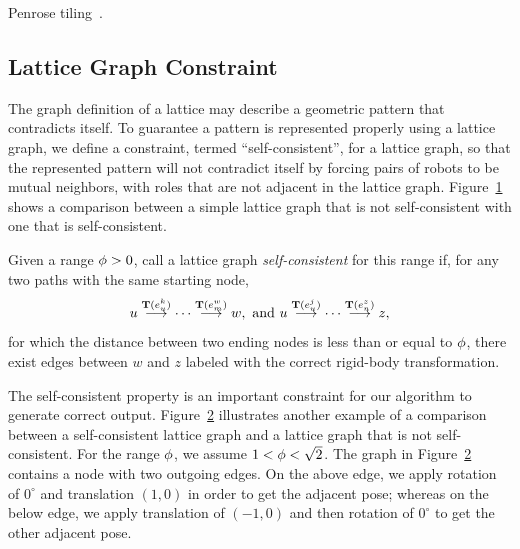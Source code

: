 Penrose tiling~\cite{Pen79, Gum96}.

\subsection{Lattice Graph Constraint}
The graph definition of a lattice may describe a geometric pattern that contradicts itself. 
To guarantee a pattern is represented properly using a lattice graph, we define a constraint, termed ``self-consistent'', for a lattice graph, so that the represented pattern will not contradict itself by forcing pairs of robots to be mutual neighbors, with roles that are not adjacent in the lattice graph. 
%
Figure~\ref{fig:self-consistent-graph} shows a comparison between a simple
lattice graph that is not self-consistent with one that is self-consistent.



\begin{defn}
  \label{def:selfconsistent}
  Given a range $\phi > 0$, call a lattice graph \textit{self-consistent} for
  this range if, for any two paths with the same starting node,
  $$ {u}\overset{\mathbf{T}(e_u^{k})}{\longrightarrow}{\cdots}\overset{\mathbf{T}(e_m^{w})}{\longrightarrow}{w}, \mbox{ and } 
    {u}\overset{\mathbf{T}(e_u^{j})}{\longrightarrow}{\cdots}\overset{\mathbf{T}(e_n^{z})}{\longrightarrow}{z}, $$
  for which the distance between two ending nodes is less than or equal to
  $\phi$, there exist edges between $w$ and $z$ labeled with the correct rigid-body transformation.
\end{defn}


\begin{figure}
    \centering
    
    \label{fig:self-consistent-graph}
\end{figure}

\begin{figure}
    \centering
    
    \label{fig:lg1}
\end{figure}
\begin{figure}
    \centering
    
    \label{fig:lg2}
\end{figure}

The self-consistent property is an important constraint for our algorithm to generate correct output. Figure~\ref{fig:lg1} illustrates another example of a comparison between a self-consistent lattice graph and a lattice graph that is not self-consistent. 
%
For the range $\phi$, we assume $1 < \phi < \sqrt{2}$.
The graph in Figure~\ref{fig:lg1} contains a node with two outgoing edges. 
On the above edge, we apply rotation of $0^{\circ}$ and translation $(1,0)$ in order to get the adjacent pose; whereas on the below edge, we apply translation of $(-1,0)$ and then rotation of $0^{\circ}$ to get the other adjacent pose. 
%


